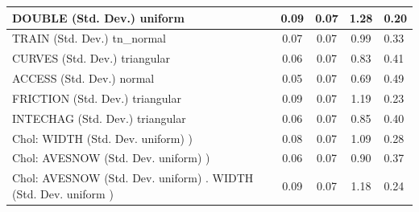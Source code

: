 \begin{table}
\begin{center}
\begin{tabular}{|l|l|c|c|c|l|}
			\hline
			DOUBLE (Std. Dev.) uniform &  & 0.09 & 0.07 & 1.28 & 0.20 \\
			\hline
			TRAIN (Std. Dev.) tn_normal &  & 0.07 & 0.07 & 0.99 & 0.33 \\
			\hline
			CURVES (Std. Dev.) triangular &  & 0.06 & 0.07 & 0.83 & 0.41 \\
			\hline
			ACCESS (Std. Dev.) normal &  & 0.05 & 0.07 & 0.69 & 0.49 \\
			\hline
			FRICTION (Std. Dev.) triangular &  & 0.09 & 0.07 & 1.19 & 0.23 \\
			\hline
			INTECHAG (Std. Dev.) triangular &  & 0.06 & 0.07 & 0.85 & 0.40 \\
			\hline
			 Chol: WIDTH (Std. Dev. uniform) ) &  & 0.08 & 0.07 & 1.09 & 0.28 \\
			\hline
			 Chol: AVESNOW (Std. Dev. uniform) ) &  & 0.06 & 0.07 & 0.90 & 0.37 \\
			\hline
			 Chol: AVESNOW (Std. Dev. uniform) . WIDTH (Std. Dev.   uniform ) &  & 0.09 & 0.07 & 1.18 & 0.24 \\
			\hline
		\end{tabular}
	\end{center}
\end{table}